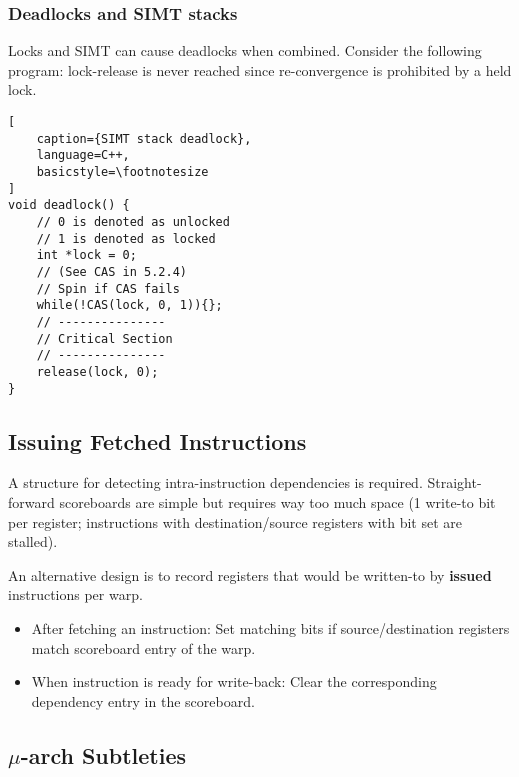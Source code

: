 \documentclass{article}
\begin{document}
\begin{multicols*}{2}
\subsubsection{Deadlocks and SIMT stacks}
Locks and SIMT can cause deadlocks when combined. Consider the following program: lock-release is never reached since re-convergence is prohibited by a held lock.

\begin{lstlisting}[
    caption={SIMT stack deadlock},
    language=C++, 
    basicstyle=\footnotesize
]
void deadlock() {
    // 0 is denoted as unlocked
    // 1 is denoted as locked
    int *lock = 0;
    // (See CAS in 5.2.4)
    // Spin if CAS fails
    while(!CAS(lock, 0, 1)){};
    // ---------------
    // Critical Section
    // ---------------
    release(lock, 0);
}
\end{lstlisting}

\subsection{Issuing Fetched Instructions}
A structure for detecting intra-instruction dependencies is required. Straight-forward scoreboards are simple but requires way too much space (1 write-to bit per register; instructions with destination/source registers with bit set are stalled). 
\medskip\par\noindent
An alternative design is to record registers that would be written-to by \textbf{issued} instructions per warp.
\begin{itemize}
    \item After fetching an instruction: Set matching bits if source/destination registers match scoreboard entry of the warp.
    \item When instruction is ready for write-back: Clear the corresponding dependency entry in the scoreboard.
\end{itemize}

\subsection{$\mu$-arch Subtleties}

\end{multicols*}
\end{document}
